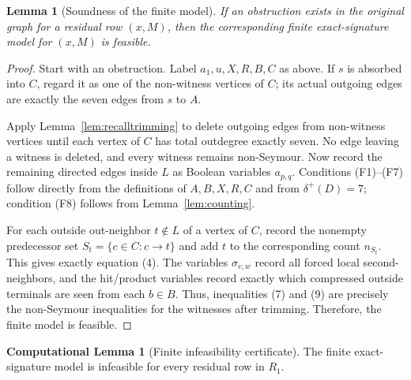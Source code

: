 \documentclass[a4paper,fleqn]{cas-sc}
\newtheorem{lemma}[theorem]{Lemma}
\theoremstyle{definition}
\newtheorem{remark}[theorem]{Remark}
\newtheorem{computationallemma}{Computational Lemma}
\begin{document}

\begin{lemma}[Soundness of the finite model]\label{lem:sound}
If an obstruction exists in the original graph for a residual row $(x,M)$, then the corresponding finite exact-signature model for $(x,M)$ is feasible.
\end{lemma}

\begin{proof}
Start with an obstruction. Label $a_1,u,X,R,B,C$ as above. If $s$ is absorbed into $C$, regard it as one of the non-witness vertices of $C$; its actual outgoing edges are exactly the seven edges from $s$ to $A$.

Apply Lemma~\ref{lem:recalltrimming} to delete outgoing edges from non-witness vertices until each vertex of $C$ has total outdegree exactly seven. No edge leaving a witness is deleted, and every witness remains non-Seymour. Now record the remaining directed edges inside $L$ as Boolean variables $a_{p,q}$. Conditions (F1)--(F7) follow directly from the definitions of $A,B,X,R,C$ and from $\delta^+(D)=7$; condition (F8) follows from Lemma~\ref{lem:counting}.

For each outside out-neighbor $t\notin L$ of a vertex of $C$, record the nonempty predecessor set $S_t=\{c\in C:c\to t\}$ and add $t$ to the corresponding count $n_{S_t}$. This gives exactly equation (4). The variables $\sigma_{v,w}$ record all forced local second-neighbors, and the hit/product variables record exactly which compressed outside terminals are seen from each $b\in B$. Thus, inequalities (7) and (9) are precisely the non-Seymour inequalities for the witnesses after trimming. Therefore, the finite model is feasible.
\end{proof}
\begin{computationallemma}[Finite infeasibility certificate]\label{lem:comp}
The finite exact-signature model is infeasible for every residual row in $R_1$.
\end{computationallemma}
\end{document}
